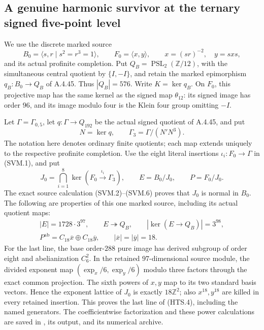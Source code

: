 \subsection{A genuine harmonic survivor at the ternary signed five-point level}

We use the discrete marked source
\[
 B_0=\langle s,r\mid s^2=r^3=1\rangle,
 \qquad F_0=\langle x,y\rangle,\qquad
 x=(sr)^{-2},\quad y=sxs,
 \tag{HTS.1}
\]
and its actual profinite completion.  Put
$Q_B=\operatorname{PSL}_2(\mathbb Z/12)$, with the
simultaneous central quotient by $\{I,-I\}$, and retain
the marked epimorphism $q_B:B_0\to Q_B$ of A.4.45.
Thus $|Q_B|=576$.  Write $K=\ker q_B$.
On $F_0$, this projective map has the same kernel as
the signed map $\theta_{12}$: its signed image has
order $96$, and its image modulo four is the Klein
four group omitting $-I$.

Let $\Gamma=\Gamma_{0,5}$, let
$q:\Gamma\to Q_{192}$ be the actual signed quotient
of A.4.45, and put
\[
 N=\ker q,\qquad \Gamma_3=\Gamma/(N'N^3).
 \tag{HTS.2}
\]
The notation here denotes ordinary finite quotients;
each map extends uniquely to the respective profinite
completion.  Use the eight literal insertions
$\iota_i:F_0\to\Gamma$ in (SVM.1), and put
\[
 J_0=\bigcap_{i=1}^{8}\ker(F_0\xrightarrow{\iota_i}
                                     \Gamma_3),
 \qquad E=B_0/J_0,\qquad P=F_0/J_0.
 \tag{HTS.3}
\]
The exact source calculation (SVM.2)--(SVM.6) proves
that $J_0$ is normal in $B_0$.  The following are
properties of this one marked source, including its
actual quotient maps:
\[
 \begin{gathered}
 |E|=1728\cdot3^{97},\qquad
 E\twoheadrightarrow Q_B,\qquad
 |\ker(E\to Q_B)|=3^{98},\\
 P^{\mathrm{ab}}=C_{18}\overline x\oplus
                   C_{18}\overline y,
 \qquad |\overline x|=|\overline y|=18.
 \end{gathered}                                      \tag{HTS.4}
\]
For the last line, the base order-$288$ pure image has
derived subgroup of order eight and abelianization
$C_6^2$.  In the retained $97$-dimensional source
module, the divided exponent map
$(\operatorname{exp}_x/6,\operatorname{exp}_y/6)$
modulo three factors through the exact common
projection.  The sixth powers of $x,y$ map to its
two standard basis vectors.  Hence the exponent
lattice of $J_0$ is exactly $18\mathbb Z^2$;
also $x^{18},y^{18}$ are killed in every retained
insertion.  This proves the last line of (HTS.4),
including the named generators.  The coefficientwise
factorization and these power calculations are saved
in , its output,
and its numerical archive.

